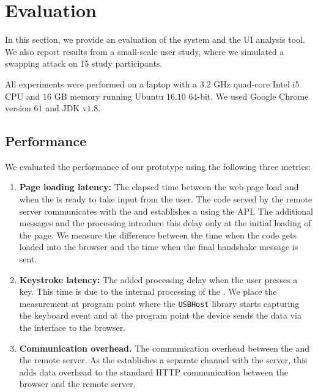 
\section{Evaluation}
\label{sec:results}

In this section, we provide an evaluation of the \name system and the \tool UI analysis tool. We also report results from a small-scale user study, where we simulated a swapping attack on 15 study participants.

 All experiments were performed on a laptop with a $3.2$ GHz quad-core Intel i5 CPU and $16$ GB memory running Ubuntu $16.10$ $64$-bit. We used Google Chrome version $61$ and JDK v$1.8$.

\subsection{\name Performance}
\label{sec:results:devicePerformance}

We evaluated the performance of our \device prototype using the following three metrics:

\begin{enumerate}
  \item \textbf{Page loading latency:} The elapsed time between the web page load and when the \device is ready to take input from the user. The \js code served by the remote server communicates with the \device and establishes a \tls using the \webusb API. The additional \tls messages and the \device processing introduce this delay only at the initial loading of the page. We measure the difference between the time when the \js code gets loaded into the browser and the time when the final \tls handshake message is sent.
  
  \item \textbf{Keystroke latency:} The added processing delay when the user presses a key. This time is due to the internal processing of the \device. We place the measurement at program point where the \texttt{USBHost} library starts capturing the keyboard event and at the program point the device sends the data via the \webusb interface to the browser.
  
  \item \textbf{Communication overhead.} The communication overhead between the \device and the remote server. As the \device establishes a separate \tls channel with the server, this adds data overhead to the standard HTTP communication between the browser and the remote server.
\end{enumerate}

